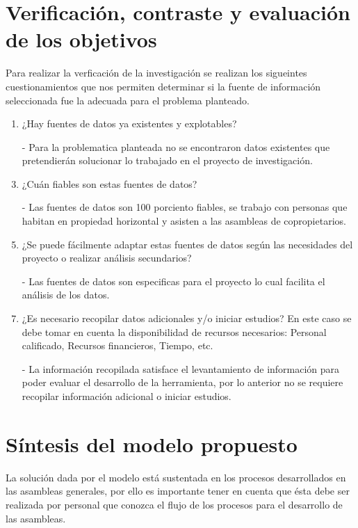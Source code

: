 \section{Verificación, contraste y evaluación de los objetivos}

Para realizar la verficación de la investigación se realizan los sigueintes cuestionamientos que nos permiten determinar si la fuente de información seleccionada fue la adecuada para el problema planteado.

\begin{enumerate}
	\item ¿Hay fuentes de datos ya existentes y explotables?
	\item[-] Para la problematica planteada no se encontraron datos existentes que pretendierán solucionar lo trabajado en el proyecto de investigación.
	
	\item ¿Cuán fiables son estas fuentes de datos?
	\item[-] Las fuentes de datos son 100 porciento fiables, se trabajo con personas que habitan en propiedad horizontal y asisten a las asambleas de copropietarios.
	
	\item ¿Se puede fácilmente adaptar estas fuentes de datos según las necesidades del
	proyecto o realizar análisis secundarios?
	\item[-] Las fuentes de datos son especificas para el proyecto lo cual facilita el análisis de los datos.
	
	\item ¿Es necesario recopilar datos adicionales y/o iniciar estudios? En este caso se debe tomar en cuenta la disponibilidad de recursos necesarios: Personal calificado, Recursos financieros, Tiempo, etc.
	\item[-] La información recopilada satisface el levantamiento de información para poder evaluar el desarrollo de la herramienta, por lo anterior no se requiere recopilar información adicional o iniciar estudios.
\end{enumerate}

\section{Síntesis del modelo propuesto}

La solución dada por el modelo está sustentada en los procesos desarrollados en las asambleas generales, por ello es importante tener en cuenta que ésta debe ser realizada por personal que conozca el flujo de los procesos para el desarrollo de las asambleas.

